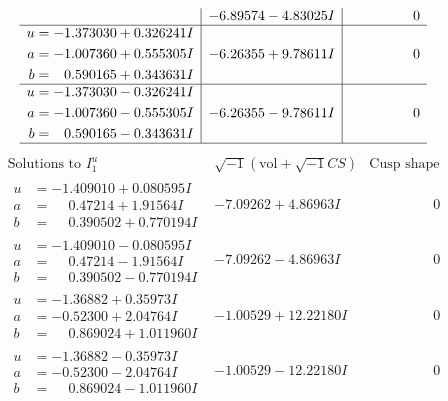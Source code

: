 \documentclass[1p]{elsarticle_modified}
\theoremstyle{definition}
\newcommand{\I}{\sqrt{-1}}
\begin{document}
$$\begin{array}{c|c|c}
 & -6.89574 - 4.83025 I & \phantom{-0.000000 } 0 \\ \hline\begin{aligned}
u &= -1.373030 + 0.326241 I \\
a &= -1.007360 + 0.555305 I \\
b &= \phantom{-}0.590165 + 0.343631 I\end{aligned}
 & -6.26355 + 9.78611 I & \phantom{-0.000000 } 0 \\ \hline\begin{aligned}
u &= -1.373030 - 0.326241 I \\
a &= -1.007360 - 0.555305 I \\
b &= \phantom{-}0.590165 - 0.343631 I\end{aligned}
 & -6.26355 - 9.78611 I & \phantom{-0.000000 } 0\\
 \hline 
 \end{array}$$\newpage$$\begin{array}{c|c|c}  
\text{Solutions to }I^u_{1}& \I (\text{vol} + \sqrt{-1}CS) & \text{Cusp shape}\\
 \hline 
\begin{aligned}
u &= -1.409010 + 0.080595 I \\
a &= \phantom{-}0.47214 + 1.91564 I \\
b &= \phantom{-}0.390502 + 0.770194 I\end{aligned}
 & -7.09262 + 4.86963 I & \phantom{-0.000000 } 0 \\ \hline\begin{aligned}
u &= -1.409010 - 0.080595 I \\
a &= \phantom{-}0.47214 - 1.91564 I \\
b &= \phantom{-}0.390502 - 0.770194 I\end{aligned}
 & -7.09262 - 4.86963 I & \phantom{-0.000000 } 0 \\ \hline\begin{aligned}
u &= -1.36882 + 0.35973 I \\
a &= -0.52300 + 2.04764 I \\
b &= \phantom{-}0.869024 + 1.011960 I\end{aligned}
 & -1.00529 + 12.22180 I & \phantom{-0.000000 } 0 \\ \hline\begin{aligned}
u &= -1.36882 - 0.35973 I \\
a &= -0.52300 - 2.04764 I \\
b &= \phantom{-}0.869024 - 1.011960 I\end{aligned}
 & -1.00529 - 12.22180 I & \phantom{-0.000000 } 0 \\ \hline\begin{aligned}

\end{aligned}
\end{array}$$
\end{document}
